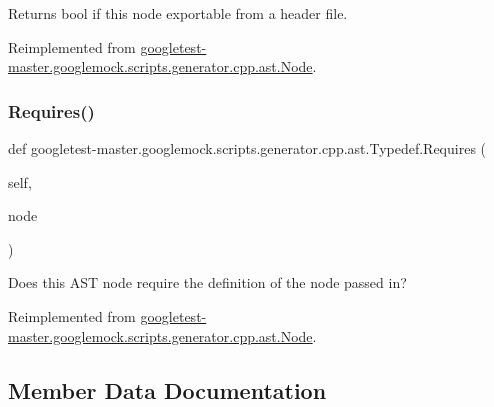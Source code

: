 \begin{DoxyVerb}Returns bool if this node exportable from a header file.\end{DoxyVerb}
 

Reimplemented from \mbox{\hyperlink{classgoogletest-master_1_1googlemock_1_1scripts_1_1generator_1_1cpp_1_1ast_1_1_node_a84e05fc36f3b1f650b0aad690ef91c3a}{googletest-\/master.\+googlemock.\+scripts.\+generator.\+cpp.\+ast.\+Node}}.

\mbox{\label{classgoogletest-master_1_1googlemock_1_1scripts_1_1generator_1_1cpp_1_1ast_1_1_typedef_af8262594635a86d4673333e39a7d3835}} 
\subsubsection{\texorpdfstring{Requires()}{Requires()}}
{\footnotesize\ttfamily def googletest-\/master.\+googlemock.\+scripts.\+generator.\+cpp.\+ast.\+Typedef.\+Requires (\begin{DoxyParamCaption}\item[{}]{self,  }\item[{}]{node }\end{DoxyParamCaption})}

\begin{DoxyVerb}Does this AST node require the definition of the node passed in?\end{DoxyVerb}
 

Reimplemented from \mbox{\hyperlink{classgoogletest-master_1_1googlemock_1_1scripts_1_1generator_1_1cpp_1_1ast_1_1_node_a2e88d3bf96b19fe72c26eec93e104381}{googletest-\/master.\+googlemock.\+scripts.\+generator.\+cpp.\+ast.\+Node}}.



\subsection{Member Data Documentation}
\mbox{\label{classgoogletest-master_1_1googlemock_1_1scripts_1_1generator_1_1cpp_1_1ast_1_1_typedef_a222f44ae556c0c1283d3939462701e20}} 

